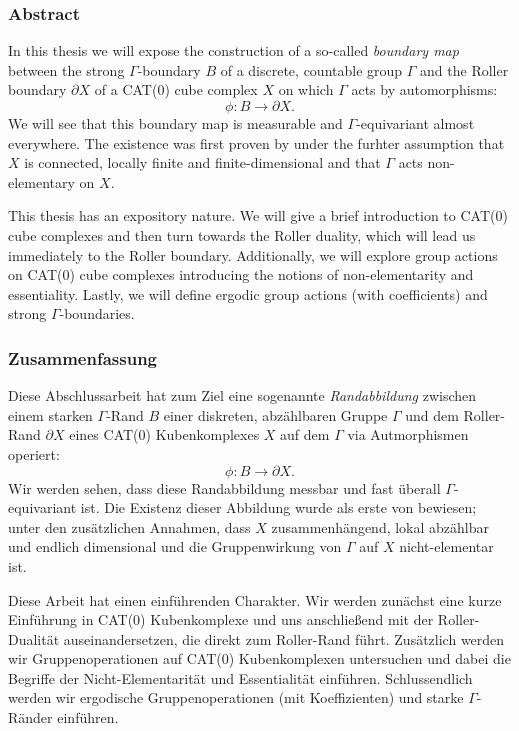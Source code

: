 \subsubsection*{Abstract}
%
\label{sec:abstract}

In this thesis we will expose the construction of a so-called \emph{boundary map} between the strong \(\Gamma\)-boundary \(B\) of a discrete, countable group \(\Gamma\) and the Roller boundary \(\partial X\) of a CAT(0) cube complex \(X\) on which \(\Gamma\) acts by automorphisms:
\[
  \phi\colon B \to \partial X.
\]
We will see that this boundary map is measurable and \(\Gamma\)-equivariant almost everywhere. The existence was first proven by \textcite{MR3509968} under the furhter assumption that \(X\) is connected, locally finite and finite-dimensional and that \(\Gamma\) acts non-elementary on \(X\). 

This thesis has an expository nature. We will give a brief introduction to CAT(0) cube complexes and then turn towards the Roller duality, which will lead us immediately to the Roller boundary. Additionally, we will explore group actions on CAT(0) cube complexes introducing the notions of non-elementarity and essentiality. Lastly, we will define ergodic group actions (with coefficients) and strong \(\Gamma\)-boundaries.


\subsubsection*{Zusammenfassung}
\label{sec:Zusammenfassung}
Diese Abschlussarbeit hat zum Ziel eine sogenannte \emph{Randabbildung} zwischen einem starken \(\Gamma\)-Rand \(B\) einer diskreten, abzählbaren Gruppe \(\Gamma\) und dem Roller-Rand \(\partial X\) eines CAT(0) Kubenkomplexes \(X\) auf dem \(\Gamma\) via Autmorphismen operiert:
\[
  \phi\colon B \to \partial X.
\]
Wir werden sehen, dass diese Randabbildung messbar und fast überall \(\Gamma\)-equivariant ist. Die Existenz dieser Abbildung wurde als erste von \textcite{MR3509968} bewiesen; unter den zusätzlichen Annahmen, dass \(X\) zusammenhängend, lokal abzählbar und endlich dimensional und die Gruppenwirkung von \(\Gamma\) auf \(X\) nicht-elementar ist.

Diese Arbeit hat einen einführenden Charakter. Wir werden zunächst eine kurze Einführung in CAT(0) Kubenkomplexe und uns anschließend mit der Roller-Dualität auseinandersetzen, die direkt zum Roller-Rand führt. Zusätzlich werden wir Gruppenoperationen auf CAT(0) Kubenkomplexen untersuchen und dabei die Begriffe der Nicht-Elementarität und Essentialität einführen. Schlussendlich werden wir ergodische Gruppenoperationen (mit Koeffizienten) und starke \(\Gamma\)-Ränder einführen.



